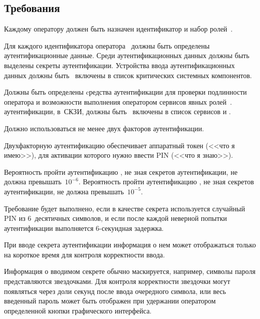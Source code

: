 \subsection{Требования}\label{IA.Reqs}

\label{R.IA.Id}
Каждому оператору должен быть назначен идентификатор и набор 
ролей~.

\label{R.IA.AuthData}
Для каждого идентификатора оператора~
должны быть определены аутентификационные данные. 
Среди аутентификационных данных должны быть выделены 
секреты аутентификации.
%
Устройства ввода аутентификационных данных должны быть~ 
включены в список критических системных компонентов. 

\label{R.IA.Auth}
Должны быть определены cредства аутентификации для проверки подлинности 
оператора и возможности выполнения оператором сервисов явных 
ролей~.
%
 аутентификации,  в~СКЗИ,
должны быть~ включены в список сервисов
и .

\label{R.IA.2FA}
Должно использоваться не менее двух факторов аутентификации.

\begin{note}
Двухфакторную аутентификацию обеспечивает аппаратный токен (<<что я имею>>), 
для активации которого нужно ввести PIN (<<что я знаю>>).
\end{note}

\label{R.IA.AuthStrength}
Вероятность пройти аутентификацию , 
не зная секретов аутентификации, 
не должна превышать~$10^{-6}$.
%
Вероятность пройти аутентификацию , 
не зная секретов аутентификации, 
не должна превышать~$10^{-5}$.

\begin{note}
Требование будет выполнено, если в качестве секрета используется случайный PIN
из $6$~десятичных символов, и если после каждой неверной попытки аутентификации
выполняется $6$-секундная задержка.
\end{note}

\label{R.IA.PwdMask}
При вводе секрета аутентификации информация о нем может отображаться только на 
короткое время для контроля корректности ввода.

\begin{note}
Информация о вводимом секрете обычно маскируется, например, символы пароля
представляются звездочками. Для контроля корректности звездочки могут появляться
через доли секунд после ввода очередного символа, или весь 
введенный пароль может быть отображен при удержании оператором определенной 
кнопки графического интерфейса.
\end{note}

